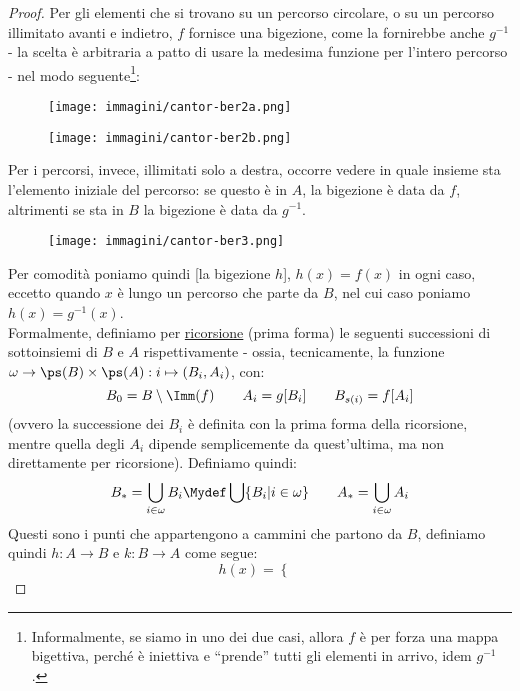 \documentclass[11pt]{scrartcl}
\begin{document}
\begin{proof}
	Per gli elementi che si trovano su un percorso circolare, o su un percorso illimitato avanti e indietro, $f$ fornisce una bigezione, come la fornirebbe anche $g^{-1}$ - la scelta è arbitraria a patto di 
	usare la medesima funzione per l'intero percorso - nel modo seguente\footnote{Informalmente, se siamo in uno dei due casi, allora $f$ è per forza una mappa bigettiva, perché è iniettiva e ``prende'' tutti gli elementi in arrivo, idem $g^{-1}$.}:
	\begin{center}
		\begin{figure}[H]
			\centering
			\texttt{[image: immagini/cantor-ber2a.png]}
		\end{figure}
	\end{center}
	\begin{center}
		\begin{figure}[H]
			\centering
			\texttt{[image: immagini/cantor-ber2b.png]}
		\end{figure}
	\end{center}
	Per i percorsi, invece, illimitati solo a destra, occorre vedere in quale insieme sta l'elemento iniziale del percorso: se questo è in $A$, la bigezione è data da $f$,
	altrimenti se sta in $B$ la bigezione è data da $g^{-1}$.
	\begin{center}
		\begin{figure}[h!]
			\centering
			\texttt{[image: immagini/cantor-ber3.png]}
		\end{figure}
	\end{center}
	Per comodità poniamo quindi [la bigezione $h$], $h(x) = f(x)$ in ogni caso, eccetto quando $x$ è lungo un percorso che parte da $B$, nel cui caso poniamo $h(x) = g^{-1}(x)$.\\
	Formalmente, definiamo per \hyperref[ric1]{ricorsione} (prima forma) le seguenti successioni di sottoinsiemi di $B$ e $A$ rispettivamente - ossia, tecnicamente, la funzione $\omega \rightarrow \ps(B) \times \ps(A) : i \mapsto (B_i,A_i)$, con:
	\[ B_0 = B \setminus\Imm(f) \qquad A_i = g[B_i] \qquad B_{s(i)} = f[A_i]
		\]
	(ovvero la successione dei $B_i$ è definita con la prima forma della ricorsione, mentre quella degli $A_i$ dipende semplicemente da quest'ultima, ma non direttamente per ricorsione). Definiamo quindi:
	\[ B_* = \bigcup_{i \in \omega}B_i \Mydef \bigcup\{B_i | i \in \omega\} \qquad A_* = \bigcup_{i \in \omega} A_i
		\]
	Questi sono i punti che appartengono a cammini che partono da $B$, definiamo quindi $h : A \rightarrow B$ e $k : B \rightarrow A$ come segue:
	\[ h(x) = \begin{cases}

\end{cases}\]
\end{proof}
\end{document}
